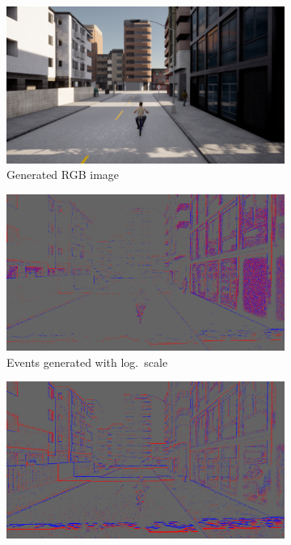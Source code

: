 \begin{figure}
  \begin{subfigure}{0.525\linewidth}
    \centering
    \includegraphics[width=\textwidth]{mainmatter/figures/4_depth_conv/carla_evts_logs_vs_linear/rgb.png}
    \caption{Generated RGB image}
  \end{subfigure}
  \begin{subfigure}{0.475\linewidth}
    \centering
    \includegraphics[width=\textwidth]{mainmatter/figures/4_depth_conv/carla_evts_logs_vs_linear/evts_log_lightgray_fixed.png}
    \caption{Events generated with log.\ scale}
  \end{subfigure}
  \begin{subfigure}{0.475\linewidth}
    \centering
    \includegraphics[width=\textwidth]{mainmatter/figures/4_depth_conv/carla_evts_logs_vs_linear/evts_linear_lightgray_fixed.png}

\end{subfigure}
\end{figure}
